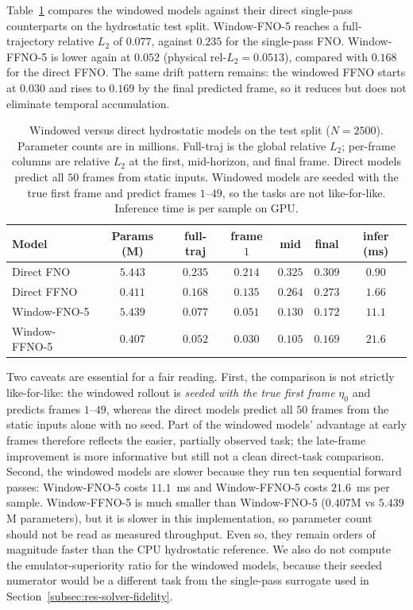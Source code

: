 Table~\ref{tab:window} compares the windowed models against their direct single-pass counterparts on the hydrostatic test split. Window-FNO-5 reaches a full-trajectory relative $L_2$ of $0.077$, against $0.235$ for the single-pass FNO. Window-FFNO-5 is lower again at $0.052$ (physical rel-$L_2 = 0.0513$), compared with $0.168$ for the direct FFNO. The same drift pattern remains: the windowed FFNO starts at $0.030$ and rises to $0.169$ by the final predicted frame, so it reduces but does not eliminate temporal accumulation.

\begin{table}[H]
\centering
\caption{Windowed versus direct hydrostatic models on the test split ($N = 2500$). Parameter counts are in millions. Full-traj is the global relative $L_2$; per-frame columns are relative $L_2$ at the first, mid-horizon, and final frame. Direct models predict all $50$ frames from static inputs. Windowed models are seeded with the true first frame and predict frames $1$--$49$, so the tasks are not like-for-like. Inference time is per sample on GPU.}
\label{tab:window}
\small
\begin{tabular}{lcccccc}
    \toprule
    Model & Params (M) & full-traj & frame $1$ & mid & final & infer (ms) \\
    \midrule
    Direct FNO       & $5.443$ & $0.235$ & $0.214$ & $0.325$ & $0.309$ & $0.90$ \\
    Direct FFNO      & $0.411$ & $0.168$ & $0.135$ & $0.264$ & $0.273$ & $1.66$ \\
    Window-FNO-5     & $5.439$ & $0.077$ & $0.051$ & $0.130$ & $0.172$ & $11.1$ \\
    Window-FFNO-5    & $0.407$ & $\mathbf{0.052}$ & $\mathbf{0.030}$ & $\mathbf{0.105}$ & $\mathbf{0.169}$ & $21.6$ \\
    \bottomrule
\end{tabular}
\end{table}

Two caveats are essential for a fair reading. First, the comparison is not strictly like-for-like: the windowed rollout is \emph{seeded with the true first frame} $\eta_0$ and predicts frames $1$--$49$, whereas the direct models predict all $50$ frames from the static inputs alone with no seed. Part of the windowed models' advantage at early frames therefore reflects the easier, partially observed task; the late-frame improvement is more informative but still not a clean direct-task comparison. Second, the windowed models are slower because they run ten sequential forward passes: Window-FNO-5 costs $11.1$~ms and Window-FFNO-5 costs $21.6$~ms per sample. Window-FFNO-5 is much smaller than Window-FNO-5 ($0.407$M vs $5.439$M parameters), but it is slower in this implementation, so parameter count should not be read as measured throughput. Even so, they remain orders of magnitude faster than the CPU hydrostatic reference. We also do not compute the emulator-superiority ratio for the windowed models, because their seeded numerator would be a different task from the single-pass surrogate used in Section~\ref{subsec:res-solver-fidelity}.

